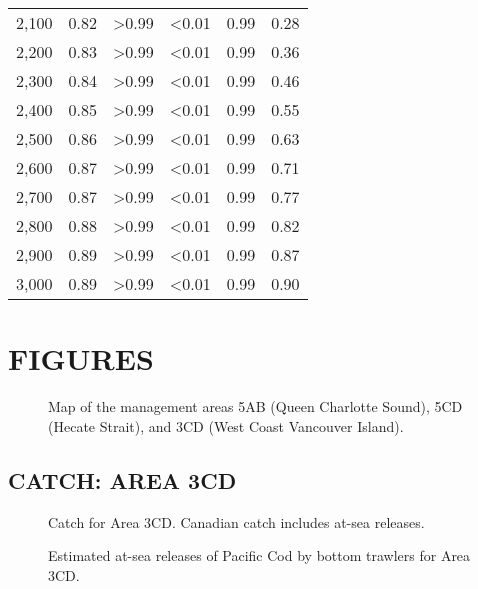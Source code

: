 \documentclass[11pt]{book}
\begin{document}
\begin{longtable}[]{@{}llllll@{}}
2,100 & 0.82 & \textgreater0.99 & \textless0.01 & 0.99 & 0.28\tabularnewline
2,200 & 0.83 & \textgreater0.99 & \textless0.01 & 0.99 & 0.36\tabularnewline
2,300 & 0.84 & \textgreater0.99 & \textless0.01 & 0.99 & 0.46\tabularnewline
2,400 & 0.85 & \textgreater0.99 & \textless0.01 & 0.99 & 0.55\tabularnewline
2,500 & 0.86 & \textgreater0.99 & \textless0.01 & 0.99 & 0.63\tabularnewline
2,600 & 0.87 & \textgreater0.99 & \textless0.01 & 0.99 & 0.71\tabularnewline
2,700 & 0.87 & \textgreater0.99 & \textless0.01 & 0.99 & 0.77\tabularnewline
2,800 & 0.88 & \textgreater0.99 & \textless0.01 & 0.99 & 0.82\tabularnewline
2,900 & 0.89 & \textgreater0.99 & \textless0.01 & 0.99 & 0.87\tabularnewline
3,000 & 0.89 & \textgreater0.99 & \textless0.01 & 0.99 & 0.90\tabularnewline
\bottomrule
\end{longtable}
\clearpage

\clearpage

\hypertarget{figures}{%
\section{FIGURES}\label{figures}}
\begin{figure}[htb]

{\centering {} 

}

\caption{Map of the management areas 5AB (Queen Charlotte Sound), 5CD (Hecate Strait), and 3CD (West Coast Vancouver Island).}\label{fig:fig-map}
\end{figure}
\clearpage

\hypertarget{catch-area-3cd}{%
\subsection{CATCH: AREA 3CD}\label{catch-area-3cd}}
\begin{figure}[htb]

{\centering {} 

}

\caption{Catch for Area 3CD. Canadian catch includes at-sea releases.}\label{fig:fig-catch-3cd}
\end{figure}
\begin{figure}[htb]

{\centering {} 

}

\caption{Estimated at-sea releases of Pacific Cod by bottom trawlers for Area 3CD.}\label{fig:fig-discards-3cd}
\end{figure}
\clearpage
\end{document}
